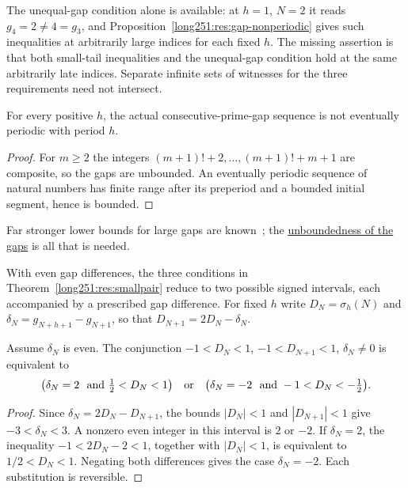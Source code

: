 The unequal-gap condition alone is available: at $h=1$, $N=2$ it reads
$g_4=2\ne4=g_3$, and Proposition~\ref{long251:res:gap-nonperiodic}
gives such inequalities at arbitrarily large indices for each fixed $h$.
The missing assertion is that both small-tail inequalities and the
unequal-gap condition hold at the same arbitrarily late indices.
Separate infinite sets of witnesses for the three requirements need not
intersect.

\begin{proposition}\label{long251:res:gap-nonperiodic}\label{res:gap-nonperiodic}
For every positive $h$, the actual consecutive-prime-gap sequence is not
eventually periodic with period $h$.
\end{proposition}

\begin{proof}
For $m\ge2$ the integers $(m+1)!+2,\ldots,(m+1)!+m+1$ are composite, so the
gaps are unbounded.  An eventually periodic sequence of natural numbers has
finite range after its preperiod and a bounded initial segment, hence is
bounded.
\end{proof}

\noindent Far stronger lower bounds for large gaps are
known~\cite[Theorem~1]{fgkmt2018}; the
\href{https://github.com/wcook04/plectis-erdos/blob/3d6d938d696fed0fb71dd55115a18a73738ff223/lean/ErdosProblems/Erdos251/PrimeGapDyadicTail.lean\#L57}{unboundedness
of the gaps} is all that is needed.

With even gap differences, the three conditions in
Theorem~\ref{long251:res:smallpair} reduce to two possible signed intervals,
each accompanied by a prescribed gap difference.  For fixed $h$ write
$D_N=\sigma_h(N)$ and $\delta_N=g_{N+h+1}-g_{N+1}$, so that
$D_{N+1}=2D_N-\delta_N$.

\begin{theorem}\label{long251:res:signedwindow}
Assume $\delta_N$ is even.  The conjunction
$-1<D_N<1$, $-1<D_{N+1}<1$, $\delta_N\ne0$ is equivalent to
\[
 \bigl(\delta_N=2\ \hbox{ and }\tfrac12<D_N<1\bigr)
 \quad\hbox{or}\quad
 \bigl(\delta_N=-2\ \hbox{ and }-1<D_N<-\tfrac12\bigr).
\]
\end{theorem}

\begin{proof}
Since $\delta_N=2D_N-D_{N+1}$, the bounds $|D_N|<1$ and
$|D_{N+1}|<1$ give $-3<\delta_N<3$.  A nonzero even integer in this
interval is $2$ or $-2$.  If $\delta_N=2$, the inequality
$-1<2D_N-2<1$, together with $|D_N|<1$, is equivalent to
$1/2<D_N<1$.  Negating both differences gives the case $\delta_N=-2$.
Each substitution is reversible.
\end{proof}

